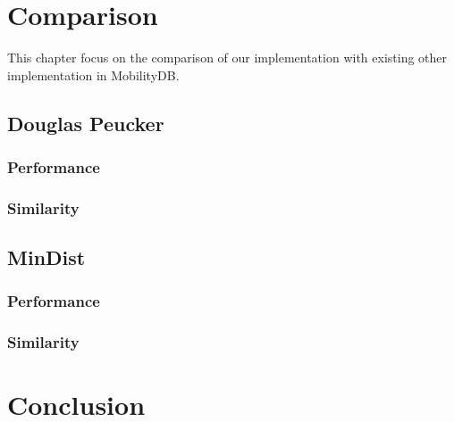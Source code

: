 \documentclass[twoside,12pt, a4paper]{report}
\begin{document}
\chapter{Comparison}
This chapter focus on the comparison of our implementation with existing other implementation in MobilityDB.

\section{Douglas Peucker}
\subsection{Performance}
\subsection{Similarity}

\section{MinDist}
\subsection{Performance}
\subsection{Similarity}

\chapter{Conclusion}

\newpage
\printbibliography
%
%
\end{document}
